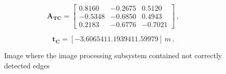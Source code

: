 \begin{equation*}
  \mathbf{A_{TC}} = \begin{bmatrix}
    0.8160 & -0.2675 & 0.5120 \\
    -0.5348        & -0.6850 & 0.4943 \\
    0.2183         & -0.6776 & -0.7021
  \end{bmatrix} \,,
\end{equation*}

\begin{equation*}
\mathbf{t_C} = [-3.60654 11.19394 11.59979] \ m \,.
\end{equation*}

\begin{figure}[htbp]
  \centering
  \qquad
  \qquad
  \qquad
  \qquad
  \caption{Image where the image processing subsystem contained not correctly detected edges}
  \label{fig:edgeDetection82}
\end{figure}

